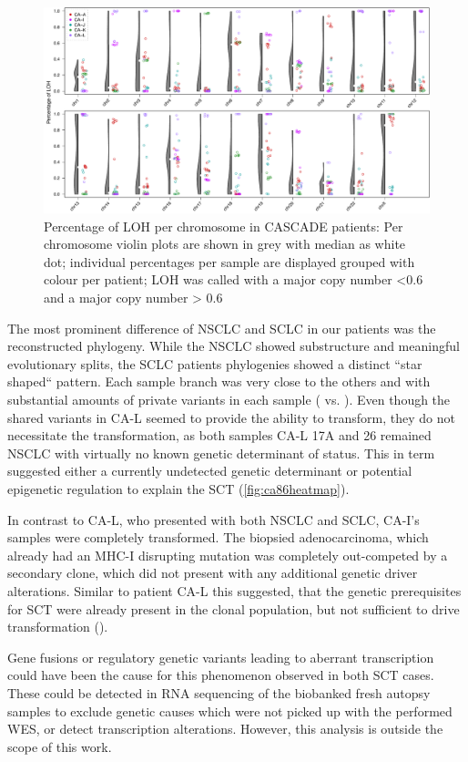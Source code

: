 \begin{figure}[ht]
\centering
\includegraphics[width=.99\linewidth]{Figures/CASCADE/LOH_perChrom.pdf}
\caption[Percentage of LOH per chromosome in CASCADE patients]{Percentage of LOH per chromosome in CASCADE patients: Per chromosome violin plots are shown in grey with median as white dot; individual percentages per sample are displayed grouped with colour per patient; LOH was called with a major copy number <0.6 and a major copy number > 0.6} \label{fig:cascadeLOH}
\end{figure}


The most prominent difference of NSCLC and SCLC in our patients was the reconstructed phylogeny. While the NSCLC showed substructure and meaningful evolutionary splits, the SCLC patients phylogenies showed a distinct ``star shaped`` pattern. Each sample branch was very close to the others and with substantial amounts of private variants in each sample ( vs. ). Even though the shared variants in CA-L seemed to provide the ability to transform, they do not necessitate the transformation, as both samples CA-L 17A and 26 remained NSCLC with virtually no known genetic determinant of status. This in term suggested either a currently undetected genetic determinant or potential epigenetic regulation to explain the SCT (\autoref{fig:ca86heatmap}).

In contrast to CA-L, who presented with both NSCLC and SCLC, CA-I's samples were completely transformed. The biopsied adenocarcinoma, which already had an MHC-I disrupting mutation was completely out-competed by a secondary clone, which did not present with any additional genetic driver alterations. Similar to patient CA-L this suggested, that the genetic prerequisites for SCT were already present in the clonal population, but not sufficient to drive transformation (). 

Gene fusions or regulatory genetic variants leading to aberrant transcription could have been the cause for this phenomenon observed in both SCT cases. These could be detected in RNA sequencing of the biobanked fresh autopsy samples to exclude genetic causes which were not picked up with the performed WES, or detect transcription alterations. However, this analysis is outside the scope of this work.

